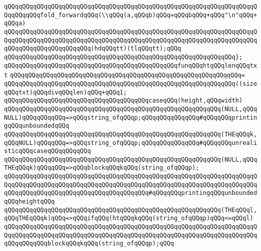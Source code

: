 \newline
\verb|qQQqqQQqqQQqqQQqqQQqqQQqqQQqqQQqqQQqqQQqqQQqqQQqqQQqqQQqqQQqqQQqqQQqqQQqqQQqqQQqfold_forwardqQQq(\\qQQq(a,qQQqb)qQQq=qQQqbqQQq+qQQq"\n"qQQq+qQQqa)|\newline
\verb|qQQqqQQqqQQqqQQqqQQqqQQqqQQqqQQqqQQqqQQqqQQqqQQqqQQqqQQqqQQqqQQqqQQqqQQqqQQqqQQqqQQqqQQqqQQqqQQqqQQqqQQqqQQqqQQqqQQqqQQqqQQqqQQqqQQqqQQqqQQqqQQqqQQqqQQqqQQqqQQqqQQq(hdqQQqtt)(tlqQQqtt);qQQq|\newline
\verb|qQQqqQQqqQQqqQQqqQQqqQQqqQQqqQQqqQQqqQQqqQQqqQQqqQQqqQQqqQQqqQQq};|\newline
\newline
\verb|qQQqqQQqqQQqqQQqqQQqqQQqqQQqqQQqqQQqqQQqqQQqqQQqfunqQQqhtqQQqlenqQQqtxt|\newline
\verb|qQQqqQQqqQQqqQQqqQQqqQQqqQQqqQQqqQQqqQQqqQQqqQQqqQQqqQQqqQQqqQQq=|\newline
\verb|qQQqqQQqqQQqqQQqqQQqqQQqqQQqqQQqqQQqqQQqqQQqqQQqqQQqqQQqqQQqqQQq((sizeqQQqtxt)qQQqdivqQQqlen)qQQq+qQQq1;|\newline
\newline
\verb|qQQqqQQqqQQqqQQqqQQqqQQqqQQqqQQqqQQqqQQqcaseqQQq(height,qQQqwidth)|\newline
\newline
\verb|qQQqqQQqqQQqqQQqqQQqqQQqqQQqqQQqqQQqqQQqqQQqqQQqqQQqqQQqqQQq(NULL,qQQqNULL)qQQqqQQqqQQq=>qQQqstring_ofqQQqp;qQQqqQQqqQQqqQQq#qQQqqQQqprintingqQQqunboundedqQQq|\newline
\verb|qQQqqQQqqQQqqQQqqQQqqQQqqQQqqQQqqQQqqQQqqQQqqQQqqQQqqQQqqQQq(THEqQQqk,qQQqNULL)qQQqqQQq=>qQQqstring_ofqQQqp;qQQqqQQqqQQqqQQq#qQQqqQQqunrealisticqQQqcaseqQQqqQQqqQQq|\newline
\verb|qQQqqQQqqQQqqQQqqQQqqQQqqQQqqQQqqQQqqQQqqQQqqQQqqQQqqQQqqQQq(NULL,qQQqTHEqQQqk)qQQqqQQq=>qQQqblockqQQqkqQQq(string_ofqQQqp);|\newline
\verb|qQQqqQQqqQQqqQQqqQQqqQQqqQQqqQQqqQQqqQQqqQQqqQQqqQQqqQQqqQQqqQQqqQQqqQQqqQQqqQQqqQQqqQQqqQQqqQQqqQQqqQQqqQQqqQQqqQQqqQQqqQQqqQQqqQQqqQQqqQQqqQQqqQQqqQQqqQQqqQQqqQQqqQQqqQQqqQQqqQQq#qQQqqQQqprintingqQQqunboundedqQQqheightqQQq|\newline
\verb|qQQqqQQqqQQqqQQqqQQqqQQqqQQqqQQqqQQqqQQqqQQqqQQqqQQqqQQqqQQq(THEqQQql,qQQqTHEqQQqk)qQQq=>qQQqifqQQq(htqQQqkqQQq(string_ofqQQqp)qQQq<=qQQql)|\newline
\verb|qQQqqQQqqQQqqQQqqQQqqQQqqQQqqQQqqQQqqQQqqQQqqQQqqQQqqQQqqQQqqQQqqQQqqQQqqQQqqQQqqQQqqQQqqQQqqQQqqQQqqQQqqQQqqQQqqQQqqQQqqQQqqQQqqQQqqQQqqQQqqQQqqQQqqQQqblockqQQqkqQQq(string_ofqQQqp);qQQq|\newline
